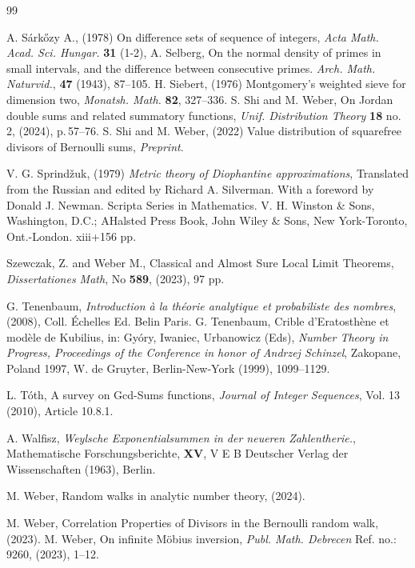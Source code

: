 \documentclass[11pt,draft,reqno]{amsart}
\theoremstyle{definition}
\theoremstyle{remarks}
\numberwithin{equation}{section}
\begin{document}
\begin{thebibliography}{99}
 
     A. S\'ark\H ozy A., (1978)  On difference sets of sequence of integers, \emph{Acta Math. Acad. Sci. Hungar.} {\bf 31} (1-2),
     A. Selberg, On the normal density of primes in small intervals, and the difference
between consecutive primes. \emph{Arch. Math. Naturvid.}, {\bf 47} (1943), 87--105.
   H. Siebert, (1976)   Montgomery's weighted sieve for dimension two,
\emph{Monatsh. Math.} {\bf 82},    \mbox{327--336.}
 S. Shi and M. Weber,   On  Jordan  double  sums and related summatory functions,  \emph{Unif. Distribution Theory}  {\bf 18}   no.\,2, (2024),   p.\,57--76.
 S. Shi and M. Weber, (2022) Value distribution of squarefree divisors of Bernoulli sums, {\it Preprint}.
 
  
 V. G. Sprind\v zuk, (1979)
\emph{Metric theory of Diophantine approximations}, Translated from the Russian and edited by Richard A. Silverman. With a foreword by Donald J. Newman. Scripta Series in Mathematics. V. H. Winston \& Sons, Washington, D.C.; AHalsted Press Book, John Wiley \& Sons, New York-Toronto, Ont.-London. xiii+156 pp.  


   Szewczak, Z.   and  Weber M., 
 Classical and Almost Sure  Local Limit Theorems,  
    \emph{Dissertationes Math}, No {\bf 589},    (2023), 97 pp.

   G. Tenenbaum,   \emph{Introduction \`a la th\'eorie analytique et  probabiliste des nombres}, (2008), Coll. \'Echelles Ed. Belin  Paris.
   G. Tenenbaum,      Crible d'Eratosth\`ene et mod\`ele de Kubilius, in:    Gy\'ory, Iwaniec,
Urbanowicz (Eds), \emph{Number Theory  in Progress, Proceedings of the Conference in honor of Andrzej Schinzel}, Zakopane, Poland 1997,
W. de Gruyter, Berlin-New-York
 (1999), 1099--1129. 
 
   L. T\'oth, A survey on Gcd-Sums functions,  \emph{Journal of Integer Sequences}, Vol. 13 (2010), Article 10.8.1.
 
  A. Walfisz, \emph{Weylsche Exponentialsummen in der neueren Zahlentherie.}, Mathematische Forschungsberichte, {\bf XV}, V E B Deutscher Verlag der Wissenschaften (1963), Berlin.

    M.  Weber,    Random   walks in analytic number theory, (2024).
   
    M.  Weber,     Correlation  Properties    of    Divisors 
   in the Bernoulli random   walk,
  (2023).    
  M.  Weber, On infinite M\"obius inversion,    \emph{Publ. Math. Debrecen} Ref. no.: 9260, (2023), 1--12.


\end{thebibliography}
\end{document}
